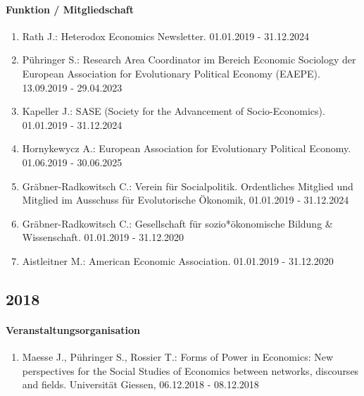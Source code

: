 \paragraph{Funktion / Mitgliedschaft}
\begin{enumerate}[leftmargin=*, labelsep=0.5cm]
\item Rath J.: Heterodox Economics Newsletter. 01.01.2019 - 31.12.2024
\item Pühringer S.: Research Area Coordinator im Bereich \glqq Economic Sociology\grqq{} der European Association for Evolutionary Political Economy (EAEPE). 13.09.2019 - 29.04.2023
\item Kapeller J.: SASE (Society for the Advancement of Socio-Economics). 01.01.2019 - 31.12.2024
\item Hornykewycz A.: European Association for Evolutionary Political Economy. 01.06.2019 - 30.06.2025
\item Gräbner-Radkowitsch C.: Verein für Socialpolitik. Ordentliches Mitglied und Mitglied im Ausschuss für Evolutorische Ökonomik, 01.01.2019 - 31.12.2024
\item Gräbner-Radkowitsch C.: Gesellschaft für sozio*ökonomische Bildung \& Wissenschaft. 01.01.2019 - 31.12.2020
\item Aistleitner M.: American Economic Association. 01.01.2019 - 31.12.2020
\end{enumerate}
\subsection*{2018}
\paragraph{Veranstaltungsorganisation}
\begin{enumerate}[leftmargin=*, labelsep=0.5cm]
\item Maesse J., Pühringer S., Rossier T.: Forms of Power in Economics: New perspectives for the Social Studies of Economics between networks, discourses and fields. Universität Giessen, 06.12.2018 - 08.12.2018
\end{enumerate}

